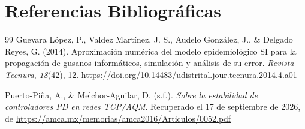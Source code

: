 \section{Referencias Bibliográficas}

\begin{thebibliography}{99}
Guevara López, P., Valdez Martínez, J. S., Audelo González, J., \& Delgado Reyes, G. (2014). Aproximación numérica del modelo epidemiológico SI para la propagación de gusanos informáticos, simulación y análisis de su error. \textit{Revista Tecnura}, \textit{18}(42), 12. \url{https://doi.org/10.14483/udistrital.jour.tecnura.2014.4.a01}

Puerto-Piña, A., \& Melchor-Aguilar, D. (s.f.). \textit{Sobre la estabilidad de controladores PD en redes TCP/AQM}. Recuperado el 17 de septiembre de 2026, de \url{https://amca.mx/memorias/amca2016/Articulos/0052.pdf}
\end{thebibliography}